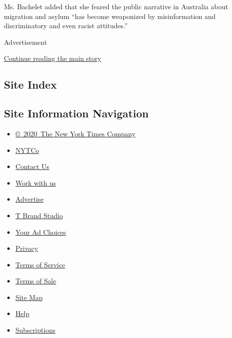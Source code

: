 Ms. Bachelet added that she feared the public narrative in Australia
about migration and asylum ``has become weaponized by misinformation and
discriminatory and even racist attitudes.''

Advertisement

\protect\hyperlink{after-bottom}{Continue reading the main story}

\hypertarget{site-index}{%
\subsection{Site Index}\label{site-index}}

\hypertarget{site-information-navigation}{%
\subsection{Site Information
Navigation}\label{site-information-navigation}}

\begin{itemize}
\tightlist
\item
  \href{https://help.nytimes3xbfgragh.onion/hc/en-us/articles/115014792127-Copyright-notice}{©~2020~The
  New York Times Company}
\end{itemize}

\begin{itemize}
\tightlist
\item
  \href{https://www.nytco.com/}{NYTCo}
\item
  \href{https://help.nytimes3xbfgragh.onion/hc/en-us/articles/115015385887-Contact-Us}{Contact
  Us}
\item
  \href{https://www.nytco.com/careers/}{Work with us}
\item
  \href{https://nytmediakit.com/}{Advertise}
\item
  \href{http://www.tbrandstudio.com/}{T Brand Studio}
\item
  \href{https://www.nytimes3xbfgragh.onion/privacy/cookie-policy\#how-do-i-manage-trackers}{Your
  Ad Choices}
\item
  \href{https://www.nytimes3xbfgragh.onion/privacy}{Privacy}
\item
  \href{https://help.nytimes3xbfgragh.onion/hc/en-us/articles/115014893428-Terms-of-service}{Terms
  of Service}
\item
  \href{https://help.nytimes3xbfgragh.onion/hc/en-us/articles/115014893968-Terms-of-sale}{Terms
  of Sale}
\item
  \href{https://spiderbites.nytimes3xbfgragh.onion}{Site Map}
\item
  \href{https://help.nytimes3xbfgragh.onion/hc/en-us}{Help}
\item
  \href{https://www.nytimes3xbfgragh.onion/subscription?campaignId=37WXW}{Subscriptions}
\end{itemize}
